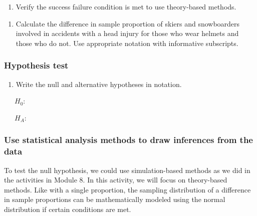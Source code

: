 \documentclass[
]{report}
\providecommand{\tightlist}{%
  \setlength{\itemsep}{0pt}\setlength{\parskip}{0pt}}
\begin{document}
\vspace{0.6in}

\begin{enumerate}
\def\labelenumi{\arabic{enumi}.}
\setcounter{enumi}{1}
\tightlist
\item
  Verify the success failure condition is met to use theory-based methods.
\end{enumerate}

\vspace{1in}

\begin{enumerate}
\def\labelenumi{\arabic{enumi}.}
\setcounter{enumi}{2}
\tightlist
\item
  Calculate the difference in sample proportion of skiers and snowboarders involved in accidents with a head injury for those who wear helmets and those who do not. Use appropriate notation with informative subscripts.
\end{enumerate}

\vspace{0.8in}

\subsubsection*{Hypothesis test}\label{hypothesis-test-2}

\begin{enumerate}
\def\labelenumi{\arabic{enumi}.}
\setcounter{enumi}{3}
\tightlist
\item
  Write the null and alternative hypotheses in notation.
\end{enumerate}

~~~\(H_0\):

\vspace{0.2in}

~~~\(H_A\):

\vspace{0.2in}

\subsubsection*{Use statistical analysis methods to draw inferences from the data}\label{use-statistical-analysis-methods-to-draw-inferences-from-the-data-3}

To test the null hypothesis, we could use simulation-based methods as we did in the activities in Module 8. In this activity, we will focus on theory-based methods. Like with a single proportion, the sampling distribution of a difference in sample proportions can be mathematically modeled using the normal distribution if certain conditions are met.
\end{document}
